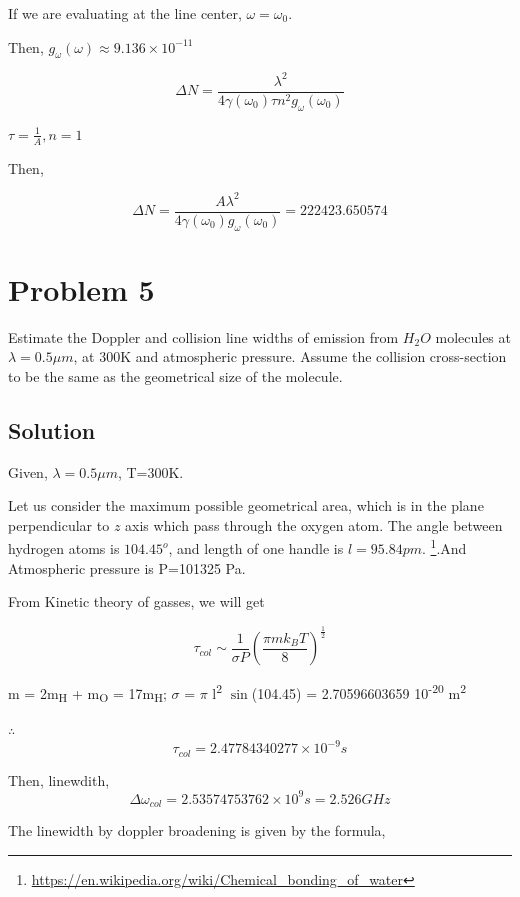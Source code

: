\documentclass[a4paper,11pt]{article}
\begin{document}
If we are evaluating at the line center, \(\omega=\omega_0\).

Then, \(g_\omega(\omega) \approx 9.136\times 10^{-11}\)

$$ \Delta N 
  = \frac{\lambda^2}{4 \gamma(\omega_0) \tau n^2 g_{\omega}(\omega_0)}$$

\(\tau = \frac{1}{A}, n=1\)

Then,

$$ \Delta N = \frac{A \lambda^2}{4\gamma(\omega_0) g_{\omega} (\omega_0)} = 222423.650574 $$
\newpage
\section*{Problem 5}
\label{sec:orge51c31f}
Estimate the Doppler and collision line widths of emission from \(H_2O\) molecules at \(\lambda = 0.5\mu m\), at 300K and atmospheric pressure. Assume the collision cross-section to be the same as the geometrical size of the molecule.

\subsection*{Solution}
\label{sec:org2b55bf3}
Given, \(\lambda = 0.5\mu m\), T=300K.

Let us consider the maximum possible geometrical area, which is in the plane perpendicular to \(z\) axis which pass through the oxygen atom. The angle between hydrogen atoms is \(104.45^o\), and length of one handle is \(l=95.84 pm\). \footnote{\url{https://en.wikipedia.org/wiki/Chemical\_bonding\_of\_water}}.And Atmospheric pressure is P=101325 Pa.

From Kinetic theory of gasses, we will get

\begin{equation}
\label{eq:orgd6d7994}
\tau_{col} \sim \frac{1}{\sigma P} \left(\frac{\pi m k_B T}{8}\right)^{\frac{1}{2}}
\end{equation}

m = 2m\textsubscript{H} + m\textsubscript{O} = 17m\textsubscript{H};
\(\sigma\) = \(\pi\) l\textsuperscript{2} \(\sin\)(104.45) = 2.70596603659\texttimes{} 10\textsuperscript{-20} m\textsuperscript{2} 

\(\therefore\)
$$\tau_{col} = 2.47784340277\times10^{-9}s$$

Then, linewdith, $$\Delta\omega_{col} = 2.53574753762\times10^9 s= 2.526 GHz$$

The linewidth by doppler broadening is given by the formula,
\end{document}
